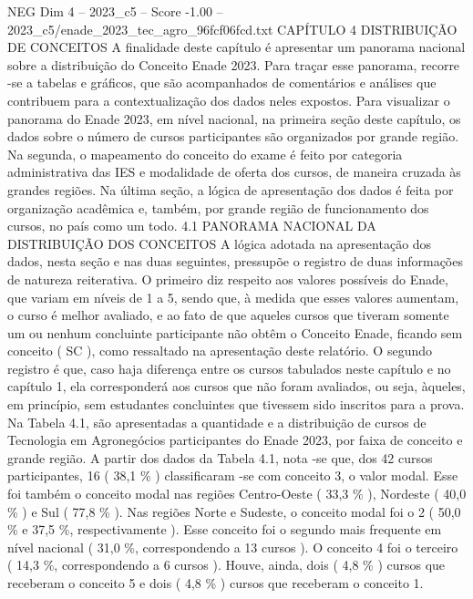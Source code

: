 \begin{textsample}{NEG Dim 4 – 2023\_c5 – Score -1.00 – 2023\_c5/enade\_2023\_tec\_agro\_96fcf06fcd.txt}  \label{ex:f4_neg_093}
CAPÍTULO 4 DISTRIBUIÇÃO DE CONCEITOS A finalidade deste capítulo é apresentar um panorama nacional sobre a distribuição do Conceito Enade 2023.
Para traçar esse panorama, recorre -se a tabelas e gráficos, que são acompanhados de comentários e análises que contribuem para a contextualização dos dados neles expostos.
Para visualizar o panorama do Enade 2023, em nível nacional, na primeira seção deste capítulo, os dados sobre o número de cursos participantes são organizados por grande região.
Na segunda, o mapeamento do conceito do exame é feito por categoria administrativa das IES e modalidade de oferta dos cursos, de maneira cruzada às grandes regiões.
Na última seção, a lógica de apresentação dos dados é feita por organização acadêmica e, também, por grande região de funcionamento dos cursos, no país como um todo. 4.1 PANORAMA NACIONAL DA DISTRIBUIÇÃO DOS CONCEITOS A lógica adotada na apresentação dos dados, nesta seção e nas duas seguintes, pressupõe o registro de duas informações de natureza reiterativa.
O primeiro diz respeito aos valores possíveis do Enade, que variam em níveis de 1 a 5, sendo que, à medida que esses valores aumentam, o curso é melhor avaliado, e ao fato de que aqueles cursos que tiveram somente um ou nenhum concluinte participante não obtêm o Conceito Enade, ficando sem conceito ( SC ), como ressaltado na apresentação deste relatório.
O segundo registro é que, caso haja diferença entre os cursos tabulados neste capítulo e no capítulo 1, ela corresponderá aos cursos que não foram avaliados, ou seja, àqueles, em princípio, sem estudantes concluintes que tivessem sido inscritos para a prova.
Na Tabela 4.1, são apresentadas a quantidade e a distribuição de cursos de Tecnologia em Agronegócios participantes do Enade 2023, por faixa de conceito e grande região.
A partir dos dados da Tabela 4.1, nota -se que, dos 42 cursos participantes, 16 ( 38,1 \% ) classificaram -se com conceito 3, o valor modal.
Esse foi também o conceito modal nas regiões Centro-Oeste ( 33,3 \% ), Nordeste ( 40,0 \% ) e Sul ( 77,8 \% ).
Nas regiões Norte e Sudeste, o conceito modal foi o 2 ( 50,0 \% e 37,5 \%, respectivamente ).
Esse conceito foi o segundo mais frequente em nível nacional ( 31,0 \%, correspondendo a 13 cursos ).
O conceito 4 foi o terceiro ( 14,3 \%, correspondendo a 6 cursos ).
Houve, ainda, dois ( 4,8 \% ) cursos que receberam o conceito 5 e dois ( 4,8 \% ) cursos que receberam o conceito 1.

\end{textsample}
